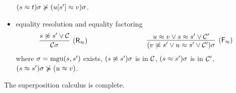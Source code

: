 \begin{definition}
\begin{itemize}
		\( (s\approx t)\sigma\not\succcurlyeq(u[s']\approx v)\sigma \).
		\item
		equality resolution and equality factoring
		\[
		\infer
		[\mathsf{(R_\mEQ)}]
		{\mcC\sigma}
		{{s\mNE s'}\lor\mcC}
		\hspace{3cm}
		\infer
		[\mathsf{(F_\mEQ)}]
		{(v\mNE s'\lor u\mEQ s'\lor\mcC')\sigma}
		{{ u\mEQ v}\lor{s\mEQ s'}\lor\mcC'}
		\]
		where
		\( \sigma=\operatorname{mgu}(s,s') \) exists,
		\( (s\not\approx s')\sigma \) is \txtMAXIMAL{} in \( \mathcal{C} \),
		\( (s\approx s')\sigma \) is \txtSTRICTLY{} in \( \mathcal{C}' \),
		\( (s\approx s')\sigma\not\succcurlyeq(u\approx v) \).
	\end{itemize}
\end{definition}

\begin{lemma}The superposition calculus is complete.\end{lemma}
